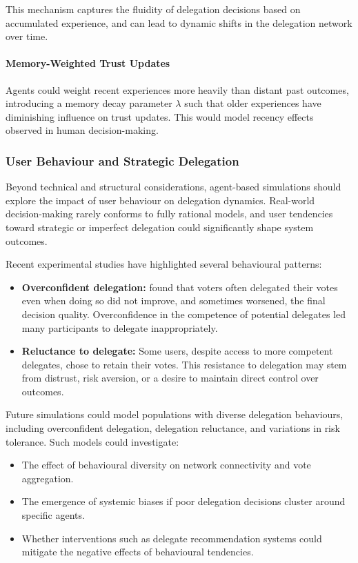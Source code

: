 This mechanism captures the fluidity of delegation decisions based on accumulated experience, and can lead to dynamic shifts in the delegation network over time.

\paragraph{Memory-Weighted Trust Updates}

Agents could weight recent experiences more heavily than distant past outcomes, introducing a memory decay parameter $\lambda$ such that older experiences have diminishing influence on trust updates. This would model recency effects observed in human decision-making.

\subsubsection{User Behaviour and Strategic Delegation}

Beyond technical and structural considerations, agent-based simulations should explore the impact of user behaviour on delegation dynamics. Real-world decision-making rarely conforms to fully rational models, and user tendencies toward strategic or imperfect delegation could significantly shape system outcomes.

Recent experimental studies have highlighted several behavioural patterns:

\begin{itemize}
\item \textbf{Overconfident delegation:} \citet{casella_2022} found that voters often delegated their votes even when doing so did not improve, and sometimes worsened, the final decision quality. Overconfidence in the competence of potential delegates led many participants to delegate inappropriately.
\item \textbf{Reluctance to delegate:} Some users, despite access to more competent delegates, chose to retain their votes. This resistance to delegation may stem from distrust, risk aversion, or a desire to maintain direct control over outcomes.
\end{itemize}

Future simulations could model populations with diverse delegation behaviours, including overconfident delegation, delegation reluctance, and variations in risk tolerance. Such models could investigate:

\begin{itemize}
\item The effect of behavioural diversity on network connectivity and vote aggregation.
\item The emergence of systemic biases if poor delegation decisions cluster around specific agents.
\item Whether interventions such as delegate recommendation systems could mitigate the negative effects of behavioural tendencies.
\end{itemize}

